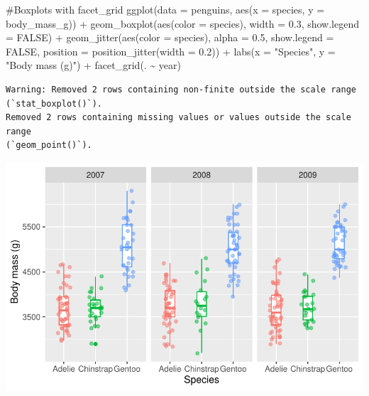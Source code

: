 \documentclass[
  letterpaper,
  DIV=11,
  numbers=noendperiod]{scrreprt}
\newenvironment{Shaded}{\begin{snugshade}}{\end{snugshade}}
\newcommand{\AttributeTok}[1]{\textcolor[rgb]{0.40,0.45,0.13}{#1}}
\newcommand{\CommentTok}[1]{\textcolor[rgb]{0.37,0.37,0.37}{#1}}
\newcommand{\ConstantTok}[1]{\textcolor[rgb]{0.56,0.35,0.01}{#1}}
\newcommand{\FloatTok}[1]{\textcolor[rgb]{0.68,0.00,0.00}{#1}}
\newcommand{\FunctionTok}[1]{\textcolor[rgb]{0.28,0.35,0.67}{#1}}
\newcommand{\NormalTok}[1]{\textcolor[rgb]{0.00,0.23,0.31}{#1}}
\newcommand{\SpecialCharTok}[1]{\textcolor[rgb]{0.37,0.37,0.37}{#1}}
\newcommand{\StringTok}[1]{\textcolor[rgb]{0.13,0.47,0.30}{#1}}
\begin{document}
\begin{Shaded}
\begin{Highlighting}[]
\CommentTok{\#Boxplots with facet\_grid}
\FunctionTok{ggplot}\NormalTok{(}\AttributeTok{data =}\NormalTok{ penguins, }\FunctionTok{aes}\NormalTok{(}\AttributeTok{x =}\NormalTok{ species, }\AttributeTok{y =}\NormalTok{ body\_mass\_g)) }\SpecialCharTok{+}
  \FunctionTok{geom\_boxplot}\NormalTok{(}\FunctionTok{aes}\NormalTok{(}\AttributeTok{color =}\NormalTok{ species), }\AttributeTok{width =} \FloatTok{0.3}\NormalTok{, }\AttributeTok{show.legend =} \ConstantTok{FALSE}\NormalTok{) }\SpecialCharTok{+}
  \FunctionTok{geom\_jitter}\NormalTok{(}\FunctionTok{aes}\NormalTok{(}\AttributeTok{color =}\NormalTok{ species), }\AttributeTok{alpha =} \FloatTok{0.5}\NormalTok{, }\AttributeTok{show.legend =} \ConstantTok{FALSE}\NormalTok{, }\AttributeTok{position =} \FunctionTok{position\_jitter}\NormalTok{(}\AttributeTok{width =} \FloatTok{0.2}\NormalTok{)) }\SpecialCharTok{+}
  \FunctionTok{labs}\NormalTok{(}\AttributeTok{x =} \StringTok{"Species"}\NormalTok{,}
       \AttributeTok{y =} \StringTok{"Body mass (g)"}\NormalTok{) }\SpecialCharTok{+}
  \FunctionTok{facet\_grid}\NormalTok{(. }\SpecialCharTok{\textasciitilde{}}\NormalTok{ year) }
\end{Highlighting}
\end{Shaded}

\begin{verbatim}
Warning: Removed 2 rows containing non-finite outside the scale range
(`stat_boxplot()`).
Removed 2 rows containing missing values or values outside the scale range
(`geom_point()`).
\end{verbatim}

\includegraphics{scripts/02_dataViz/class4_files/figure-pdf/facet_grid-2.pdf}
\end{document}

